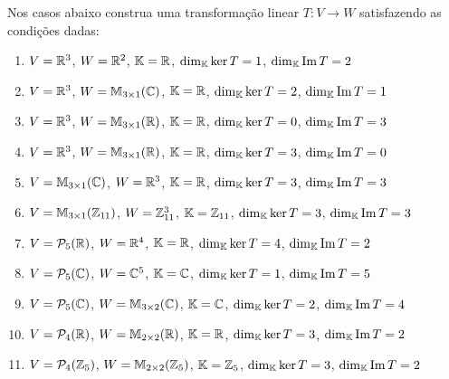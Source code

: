 \documentclass[12pt]{exam}
\begin{document}
\begin{exercicio}
	Nos casos abaixo construa uma transforma\c{c}\~ao linear $T : V \to W$ satisfazendo as condi\c{c}\~oes dadas:
	\begin{enumerate}[label=({\alph*})]
		\item $V = \mathbb{R}^3$, $W = \mathbb{R}^2$, $\mathbb{K} = \mathbb{R}$, $\dim_{\mathbb{K}} \ker T = 1$, $\dim_{\mathbb{K}} {\rm Im\,} T = 2$
		\item $V = \mathbb{R}^3$, $W = \mathbb{M}_{3\times 1}(\mathbb{C})$, $\mathbb{K} = \mathbb{R}$, $\dim_{\mathbb{K}} \ker T = 2$, $\dim_{\mathbb{K}} {\rm Im\,} T = 1$
		\item $V = \mathbb{R}^3$, $W = \mathbb{M}_{3\times 1}(\mathbb{R})$, $\mathbb{K} = \mathbb{R}$, $\dim_{\mathbb{K}} \ker T = 0$, $\dim_{\mathbb{K}} {\rm Im\,} T = 3$
		\item $V = \mathbb{R}^3$, $W = \mathbb{M}_{3\times 1}(\mathbb{R})$, $\mathbb{K} = \mathbb{R}$, $\dim_{\mathbb{K}} \ker T = 3$, $\dim_{\mathbb{K}} {\rm Im\,} T = 0$
		\item $V = \mathbb{M}_{3\times 1}(\mathbb{C})$, $W = \mathbb{R}^3$, $\mathbb{K} = \mathbb{R}$, $\dim_{\mathbb{K}} \ker T = 3$, $\dim_{\mathbb{K}} {\rm Im\,} T = 3$
		\item $V = \mathbb{M}_{3\times 1}(\mathbb{Z}_{11})$, $W = \mathbb{Z}_{11}^3$, $\mathbb{K} = \mathbb{Z}_{11}$, $\dim_{\mathbb{K}} \ker T = 3$, $\dim_{\mathbb{K}} {\rm Im\,} T = 3$
		\item $V = \mathcal{P}_5(\mathbb{R})$, $W = \mathbb{R}^4$, $\mathbb{K} = \mathbb{R}$, $\dim_{\mathbb{K}} \ker T = 4$, $\dim_{\mathbb{K}} {\rm Im\,} T = 2$
		\item $V = \mathcal{P}_5(\mathbb{C})$, $W = \mathbb{C}^5$, $\mathbb{K} = \mathbb{C}$, $\dim_{\mathbb{K}} \ker T = 1$, $\dim_{\mathbb{K}} {\rm Im\,} T = 5$
		\item $V = \mathcal{P}_5(\mathbb{C})$, $W = \mathbb{M}_{3\times 2}(\mathbb{C})$, $\mathbb{K} = \mathbb{C}$, $\dim_{\mathbb{K}} \ker T = 2$, $\dim_{\mathbb{K}} {\rm Im\,} T = 4$
		\item $V = \mathcal{P}_4(\mathbb{R})$, $W = \mathbb{M}_{2\times 2}(\mathbb{R})$, $\mathbb{K} = \mathbb{R}$, $\dim_{\mathbb{K}} \ker T = 3$, $\dim_{\mathbb{K}} {\rm Im\,} T = 2$
		\item $V = \mathcal{P}_4(\mathbb{Z}_5)$, $W = \mathbb{M}_{2\times 2}(\mathbb{Z}_5)$, $\mathbb{K} = \mathbb{Z}_5$, $\dim_{\mathbb{K}} \ker T = 3$, $\dim_{\mathbb{K}} {\rm Im\,} T = 2$
	\end{enumerate}
\end{exercicio}
\end{document}
